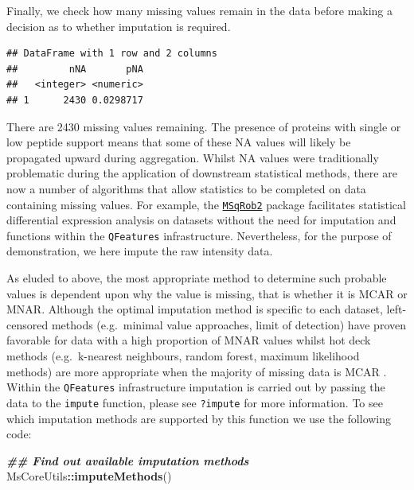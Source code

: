 \documentclass[9pt,a4paper,]{extarticle}
\newenvironment{Shaded}{\begin{snugshade}}{\end{snugshade}}
\newcommand{\DocumentationTok}[1]{\textcolor[rgb]{0.56,0.35,0.01}{\textbf{\textit{#1}}}}
\newcommand{\FunctionTok}[1]{\textcolor[rgb]{0.13,0.29,0.53}{\textbf{#1}}}
\newcommand{\NormalTok}[1]{#1}
\newcommand{\SpecialCharTok}[1]{\textcolor[rgb]{0.81,0.36,0.00}{\textbf{#1}}}
\newcommand{\StringTok}[1]{\textcolor[rgb]{0.31,0.60,0.02}{#1}}
\begin{document}
Finally, we check how many missing values remain in the data before making a
decision as to whether imputation is required.

\begin{Shaded}
\end{Shaded}

\begin{verbatim}
## DataFrame with 1 row and 2 columns
##         nNA       pNA
##   <integer> <numeric>
## 1      2430 0.0298717
\end{verbatim}

There are 2430 missing values remaining.
The presence of proteins with single or low peptide support means that some of
these NA values will likely be propagated upward during aggregation. Whilst NA
values were traditionally problematic during the application of downstream
statistical methods, there are now a number of algorithms that allow statistics
to be completed on data containing missing values. For example, the
\href{https://www.bioconductor.org/packages/release/bioc/html/msqrob2.html}{\texttt{MSqRob2}}
\citep{Sticker2020, Goeminne2020, Goeminne2016} package facilitates statistical
differential expression analysis on datasets without the need for imputation and
functions within the \texttt{QFeatures} infrastructure. Nevertheless, for the purpose of
demonstration, we here impute the raw intensity data.

As eluded to above, the most appropriate method to determine such probable
values is dependent upon why the value is missing, that is whether it is MCAR or
MNAR. Although the optimal imputation method is specific to each dataset,
left-censored methods (e.g.~minimal value approaches, limit of detection) have
proven favorable for data with a high proportion of MNAR values whilst hot deck
methods (e.g.~k-nearest neighbours, random forest, maximum likelihood methods)
are more appropriate when the majority of missing data is MCAR \citep[e.g.,][]{Liu2021, Lazar2016}. Within the \texttt{QFeatures} infrastructure imputation is carried out by
passing the data to the \texttt{impute} function, please see \texttt{?impute} for more
information. To see which imputation methods are supported by this function we
use the following code:

\begin{Shaded}
\begin{Highlighting}[]
\DocumentationTok{\#\# Find out available imputation methods}
\NormalTok{MsCoreUtils}\SpecialCharTok{::}\FunctionTok{imputeMethods}\NormalTok{()}
\end{Highlighting}
\end{Shaded}
\end{document}

